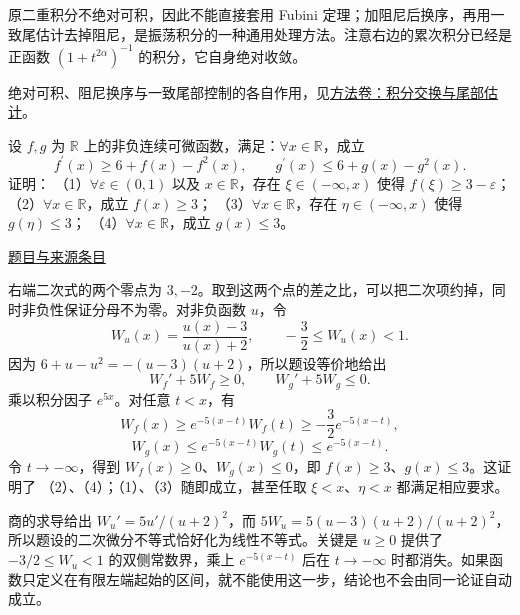 \documentclass[12pt,fontset=fandol]{ctexart}
\begin{document}
\begin{remark}[方法与条件]原二重积分不绝对可积，因此不能直接套用 Fubini 定理；加阻尼后换序，再用一致尾估计去掉阻尼，是振荡积分的一种通用处理方法。注意右边的累次积分已经是正函数 $(1+t^{2\alpha})^{-1}$ 的积分，它自身绝对收敛。

绝对可积、阻尼换序与一致尾部控制的各自作用，见\hyperref[app:integration-exchange]{方法卷：积分交换与尾部估计}。\end{remark}

\begin{example}[来源序号6]\label{ex:ch07-13th-A:6}\label{pr:ch07-13th-A:6}

设 $f,g$ 为 $\mathbb{R}$ 上的非负连续可微函数，满足：$\forall x\in\mathbb{R}$，成立
\[
f^{\prime}(x)\geq 6+f(x)-f^{2}(x),\qquad g^{\prime}(x)\leq 6+g(x)-g^{2}(x).
\]
证明：
（1）$\forall\varepsilon\in(0,1)$ 以及 $x\in\mathbb{R}$，存在 $\xi\in(-\infty,x)$ 使得 $f(\xi)\geq 3-\varepsilon$；
（2）$\forall x\in\mathbb{R}$，成立 $f(x)\geq 3$；
（3）$\forall x\in\mathbb{R}$，存在 $\eta\in(-\infty,x)$ 使得 $g(\eta)\leq 3$；
（4）$\forall x\in\mathbb{R}$，成立 $g(x)\leq 3$。

\par\href{https://github.com/lzxcr/cmc-mathematics/blob/64916fa1fdbc3e444a652eca204d5669058ee321/src/problems/preliminary/13/06.md}{题目与来源条目}

\end{example}

\begin{solve}\label{ans:ch07-13th-A:6}

右端二次式的两个零点为 $3,-2$。取到这两个点的差之比，可以把二次项约掉，同时非负性保证分母不为零。对非负函数 $u$，令
\[
W_u(x)=\frac{u(x)-3}{u(x)+2},\qquad -\frac32\leq W_u(x)<1.
\]
因为 $6+u-u^2=-(u-3)(u+2)$，所以题设等价地给出
\[
W_f'+5W_f\geq0,\qquad W_g'+5W_g\leq0.
\]
乘以积分因子 $e^{5x}$。对任意 $t<x$，有
\[
W_f(x)\geq e^{-5(x-t)}W_f(t)
\geq-\frac32e^{-5(x-t)},
\]
\[
W_g(x)\leq e^{-5(x-t)}W_g(t)
\leq e^{-5(x-t)}.
\]
令 $t\to-\infty$，得到 $W_f(x)\geq0$、$W_g(x)\leq0$，即 $f(x)\geq3$、$g(x)\leq3$。这证明了 （2）、（4）；（1）、（3）随即成立，甚至任取 $\xi<x$、$\eta<x$ 都满足相应要求。

商的求导给出 $W_u'=5u'/(u+2)^2$，而 $5W_u=5(u-3)(u+2)/(u+2)^2$，所以题设的二次微分不等式恰好化为线性不等式。关键是 $u\ge0$ 提供了 $-3/2\le W_u<1$ 的双侧常数界，乘上 $e^{-5(x-t)}$ 后在 $t\to-\infty$ 时都消失。如果函数只定义在有限左端起始的区间，就不能使用这一步，结论也不会由同一论证自动成立。

\end{solve}
\end{document}
